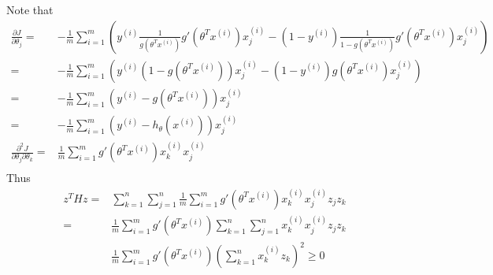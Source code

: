 \begin{answer}
	Note that
	\begin{align*}
		\frac{\partial J}{\partial \theta_j} =& -\frac{1}{m}\sum_{i=1}^{m}\left( y^{(i)}\frac{1}{g(\theta^Tx^{(i)})}g'(\theta^Tx^{(i)})x^{(i)}_j-(1-y^{(i)})\frac{1}{1-g(\theta^Tx^{(i)})}g'(\theta^Tx^{(i)})x^{(i)}_j\right) \\
		=&-\frac{1}{m}\sum_{i=1}^{m}\left( y^{(i)}(1-g(\theta^Tx^{(i)}))x^{(i)}_j-(1-y^{(i)})g(\theta^Tx^{(i)})x^{(i)}_j\right)\\
		=&-\frac{1}{m}\sum_{i=1}^{m}\left( y^{(i)}-g(\theta^Tx^{(i)})\right)x^{(i)}_j\\
		=&-\frac{1}{m}\sum_{i=1}^{m}\left( y^{(i)}-h_{\theta}(x^{(i)})\right)x^{(i)}_j\\
		\frac{\partial^2 J}{\partial \theta_j\partial \theta_k} 
		=&\frac{1}{m}\sum_{i=1}^{m}g'(\theta^Tx^{(i)})x^{(i)}_kx^{(i)}_j\\
		\end{align*}
		Thus
		\begin{align*} z^THz=&\sum_{k=1}^{n}\sum_{j=1}^{n}\frac{1}{m}\sum_{i=1}^{m}g'(\theta^Tx^{(i)})x^{(i)}_kx^{(i)}_jz_jz_k\\
	=&\frac{1}{m}\sum_{i=1}^{m}g'(\theta^Tx^{(i)})\sum_{k=1}^{n}\sum_{j=1}^{n}x^{(i)}_kx^{(i)}_jz_jz_k\\
	&\frac{1}{m}\sum_{i=1}^{m}g'(\theta^Tx^{(i)})(\sum_{k=1}^{n}x^{(i)}_kz_k)^2\geq 0
	\end{align*}

\end{answer}
